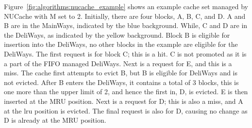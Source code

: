 Figure~\ref{fig:algorithms:nucache_example} shows an example cache set managed by NUCache with M set to 2.
Initially, there are four blocks, A, B, C, and D.
A and B are in the MainWays, indicated by the blue background.
While, C and D are in the DeliWays, as indicated by the yellow background.
Block B is eligible for insertion into the DeliWays, no other blocks in the example are eligible for the DeliWays.
The first request is for block C; this is a hit.
C is not promoted as it is a part of the FIFO managed DeliWays.
Next is a request for E, and this is a miss.
The cache first attempts to evict B, but B is eligible for DeliWays and is not evicted.
After B enters the DeliWays, it contains a total of 3 blocks, this is one more than the upper limit of 2, and hence the first in, D, is evicted.
E is then inserted at the MRU position.
Next is a request for D; this is also a miss, and A at the \gls{lru} position is evicted.
The final request is also for D, causing no change as D is already at the MRU position.

